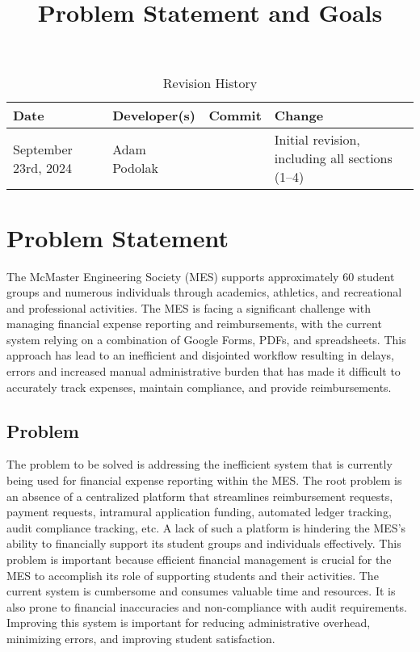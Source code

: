 \documentclass{article}
\title{Problem Statement and Goals\\\progname}
\author{\authname}
\date{}
\begin{document}
\maketitle

\begin{table}[htp]
\centering
\caption{Revision History}
\label{TblRevisionHistory}
\begin{tabularx}{\textwidth}{l l l X}
\toprule
\textbf{Date} & \textbf{Developer(s)} & \textbf{Commit} & \textbf{Change}\\
\midrule
September 23rd, 2024 & Adam Podolak &  & Initial revision, including all sections (1--4)\\
\bottomrule
\end{tabularx}
\end{table}

\section{Problem Statement}



The McMaster Engineering Society (MES) supports approximately 60 student groups and numerous individuals through academics, athletics, and recreational and professional activities. The MES is facing a significant challenge with managing financial expense reporting and reimbursements, with the current system relying on a combination of Google Forms, PDFs, and spreadsheets. This approach has lead to an inefficient and disjointed workflow resulting in delays, errors and increased manual administrative burden that has made it difficult to accurately track expenses, maintain compliance, and provide reimbursements. 

\subsection{Problem}

The problem to be solved is addressing the inefficient system that is currently being used for financial expense reporting within the MES. The root problem is an absence of a centralized platform that streamlines reimbursement requests, payment requests, intramural application funding, automated ledger tracking, audit compliance tracking, etc. A lack of such a platform is hindering the MES's ability to financially support its student groups and individuals effectively. This problem is important because efficient financial management is crucial for the MES to accomplish its role of supporting students and their activities. The current system is cumbersome and consumes valuable time and resources. It is also prone to financial inaccuracies and non-compliance with audit requirements. Improving this system is important for reducing administrative overhead, minimizing errors, and improving student satisfaction.
\end{document}
